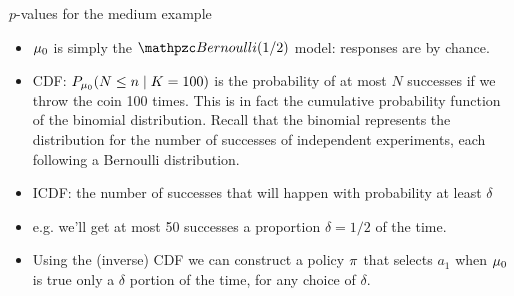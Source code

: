 \begin{frame}
  \begin{block}{$p$-values for the medium example}
    \begin{itemize}
    \item<2->$\mu_0$ is simply the $\Bernoulli(1/2)$ model:
      responses are by chance. 
    \item<3->CDF: $P_{\mu_0}(N \leq n \mid K = 100)$  {is the probability of at most $N$ successes if we throw the coin 100 times. This is in fact the cumulative probability function of the binomial distribution. Recall that the binomial represents the distribution for the number of successes of independent experiments, each following a Bernoulli distribution.}
    \item<4->ICDF:  the number of successes that will happen with probability at least $\delta$
    \item<5->e.g. we'll get at most 50 successes a proportion $\delta = 1/2$ of the time.
    \item<6>Using the (inverse) CDF we can construct a policy $\pi$ that selects $a_1$ when $\mu_0$ is true only a $\delta$ portion of the time, for any choice of $\delta$.
    \end{itemize}
  \end{block}
  \begin{columns}
    \setlength{}
    \setlength{}
    \begin{column}{0.5\textwidth}
    \end{column}
    \begin{column}{0.5\textwidth}
    \end{column}
  \end{columns}    
\end{frame}



